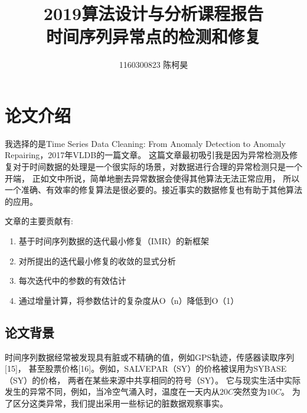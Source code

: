 \documentclass[12pt,a4paper]{article}
\title{2019算法设计与分析课程报告  \\ 时间序列异常点的检测和修复}
\author{1160300823  陈柯昊}
\begin{document}
\maketitle
\section{论文介绍}
我选择的是Time Series Data Cleaning: From Anomaly Detection to Anomaly Repairing，2017年VLDB的一篇文章。
这篇文章最初吸引我是因为异常检测及修复对于时间数据的处理是一个很实际的场景，对数据进行合理的异常检测只是一个开端，
正如文中所说，简单地删去异常数据会使得其他算法无法正常应用，
所以一个准确、有效率的修复算法是很必要的。接近事实的数据修复也有助于其他算法的应用。
\par
文章的主要贡献有:
\begin{enumerate}
 \item 基于时间序列数据的迭代最小修复（IMR）的新框架
 \item 对所提出的迭代最小修复的收敛的显式分析
 \item 每次迭代中的参数的有效估计
 \item 通过增量计算，将参数估计的复杂度从O（n）降低到O（1）   
\end{enumerate}
\subsection{论文背景}
时间序列数据经常被发现具有脏或不精确的值，例如GPS轨迹，传感器读取序列[15]，
甚至股票价格[16]。例如，SALVEPAR（SY）的价格被误用为SYBASE（SY）的价格，
两者在某些来源中共享相同的符号（SY）。
它与现实生活中实际发生的异常不同，例如，当冷空气涌入时，温度在一天内从$20C$突然变为$10C$。
为了区分这类异常，我们提出采用一些标记的脏数据观察事实。
\end{document}
